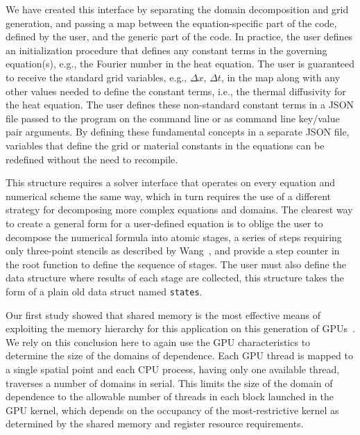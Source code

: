 We have created this interface by separating the domain decomposition and grid generation, and passing
a map between the equation-specific part of the code, defined by the user, and the generic part of the code.
In practice, the user defines an initialization procedure that defines any constant terms in the
governing equation(s), e.g., the Fourier number in the heat equation.
The user is guaranteed to receive the standard grid variables, e.g., $\Delta x$, $\Delta t$, in the map
along with any other values needed to define the constant terms, i.e., the thermal diffusivity
for the heat equation.
The user defines these non-standard constant terms in a JSON file passed to the program on the command line
or as command line key/value pair arguments. By defining these fundamental concepts in a separate JSON
file, variables that define the grid or material constants in the equations can be redefined without
the need to recompile.

This structure requires a solver interface that operates on every equation and numerical scheme
the same way, which in turn requires the use of a different strategy for decomposing more complex
equations and domains.
The clearest way to create a general form for a user-defined equation is to oblige the user to decompose
the numerical formula into atomic stages, a series of steps requiring only three-point stencils as described
by Wang~\cite{WangDecomp}, and provide a step counter in the root function to define the sequence of stages.
The user must also define the data structure where results of each stage are collected, this structure takes the form of a plain old data struct named \texttt{states}.

Our first study showed that shared memory is the most effective means of exploiting the memory hierarchy
for this application on this generation of GPUs~\cite{OurJCP}.
We rely on this conclusion here to again use the GPU characteristics to determine the size of the
domains of dependence.
Each GPU thread is mapped to a single spatial point and each CPU process, having only one available thread,
traverses a number of domains in serial.
This limits the size of the domain of dependence to the allowable number of threads in each block launched
in the GPU kernel, which depends on the occupancy of the most-restrictive kernel as determined by the shared
memory and register resource requirements.


